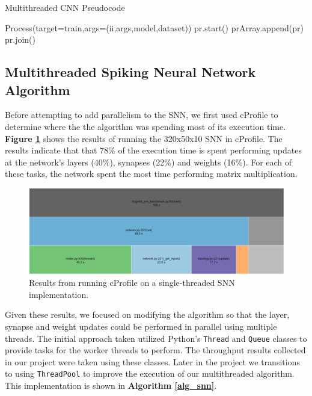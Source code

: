 \documentclass[journal]{IEEEtran}
\begin{document}
\begin{algorithm}
\caption{Multithreaded CNN Pseudocode}
\begin{algorithmic}
    Process(target=train,args=(ii,args,model,dataset))
    pr.start() \break
    prArray.append(pr)
\ENDFOR
{}
    pr.join()
\ENDFOR
\end{algorithmic}
\end{algorithm}

\subsection{Multithreaded Spiking Neural Network Algorithm}

Before attempting to add parallelism to the SNN, we first used cProfile to determine where the the algorithm was spending most of its execution time. \textbf{Figure \ref{fig_cprofile}} shows the results of running the 320x50x10 SNN in cProfile. The results indicate that that 78\% of the execution time is spent performing updates at the network's layers (40\%), synapses (22\%) and weights (16\%). For each of these tasks, the network spent the most time performing matrix multiplication.

\begin{figure}[!t]
\centering
\includegraphics[width=\linewidth]{cprofile.png}
\caption{Results from running cProfile on a single-threaded SNN implementation.}
\label{fig_cprofile}
\end{figure}

Given these results, we focused on modifying the algorithm so that the layer, synapse and weight updates could be performed in parallel using multiple threads. The initial approach taken utilized Python's \verb|Thread| and \verb|Queue| classes to provide tasks for the worker threads to perform. The throughput results collected in our project were taken using these classes. Later in the project we transitions to using \verb|ThreadPool| to improve the execution of our multithreaded algorithm. This implementation is shown in \textbf{Algorithm \ref{alg_snn}}. 
\end{document}
